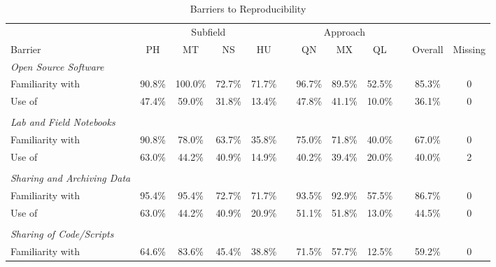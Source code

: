 \documentclass[]{interact}
\theoremstyle{plain}%
\theoremstyle{definition}
\theoremstyle{remark}
\begin{document}
\newpage
\begin{landscape}
\begin{table}[h]
    \centering
    \begin{threeparttable}
    \caption{Barriers to Reproducibility}
    \begin{tabular}{l c c c c c c c c c c c}
         \hline
                    & \multicolumn{4}{1}{Subfield}  & & \multicolumn{3}{1}{Approach} & & & \\
         Barrier                            & PH & MT & NS & HU                   & & QN & MX & QL           & & Overall & Missing \\
         \hline
         \textit{Open Source Software}      & & & & & & & & & & & \\
         Familiarity with                   & 90.8\% & 100.0\% & 72.7\% & 71.7\% & & 96.7\% & 89.5\% & 52.5\% & & 85.3\% & 0 \\
         Use of                             & 47.4\% & 59.0\% & 31.8\% & 13.4\% & & 47.8\% & 41.1\% & 10.0\% & & 36.1\% & 0 \\
                                            & & & & & & & & & & &\\
         \textit{Lab and Field Notebooks}   & & & & & & & & & & & \\
         Familiarity with                   & 90.8\% & 78.0\% & 63.7\% & 35.8\% & & 75.0\% & 71.8\% & 40.0\% & & 67.0\% & 0 \\
         Use of                             & 63.0\% & 44.2\% & 40.9\% & 14.9\% & & 40.2\% & 39.4\% & 20.0\% & & 40.0\% & 2 \\
                                            & & & & & & & & & & & \\
         \textit{Sharing and Archiving Data}     & & & & & & & & & & & \\
         Familiarity with                   & 95.4\% & 95.4\% & 72.7\% & 71.7\% & & 93.5\% & 92.9\% & 57.5\% & & 86.7\% & 0 \\
         Use of                             & 63.0\% & 44.2\% & 40.9\% & 20.9\% & & 51.1\% & 51.8\% & 13.0\% & & 44.5\% & 0 \\
                                            & & & & & & & & & & & \\
         \textit{Sharing of Code/Scripts}     & & & & & & & & & & & \\
         Familiarity with                   & 64.6\% & 83.6\% & 45.4\% & 38.8\% & & 71.5\% & 57.7\% & 12.5\% & & 59.2\% & 0 \\

\end{tabular}
\end{threeparttable}
\end{table}
\end{landscape}
\end{document}

